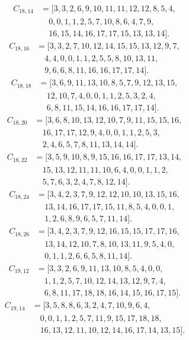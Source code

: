 \documentclass[11pt,a4paper]{article}
\theoremstyle{definition}\newtheorem{definition}[theorem]{Definition}
\theoremstyle{remark}\newtheorem{remark}[theorem]{Remark}
\begin{document}
\[\begin{aligned}
C_{18,14}&=[3,3,2,6,9,10,11,11,12,12,8,5,4,\\
&\quad 0,0,1,1,2,5,7,10,8,6,4,7,9,\\
&\quad 16,15,14,16,17,17,15,13,13,14].
\end{aligned}\]
\[\begin{aligned}
C_{18,16}&=[3,3,2,7,10,12,14,15,15,13,12,9,7,\\
&\quad 4,4,0,0,1,1,2,5,5,8,10,13,11,\\
&\quad 9,6,6,8,11,16,16,17,17,14].
\end{aligned}\]
\[\begin{aligned}
C_{18,18}&=[3,6,9,11,13,10,8,5,7,9,12,13,15,\\
&\quad 12,10,7,4,0,0,1,1,2,5,3,2,4,\\
&\quad 6,8,11,15,14,16,16,17,17,14].
\end{aligned}\]
\[\begin{aligned}
C_{18,20}&=[3,6,8,10,13,12,10,7,9,11,15,15,16,\\
&\quad 16,17,17,12,9,4,0,0,1,1,2,5,3,\\
&\quad 2,4,6,5,7,8,11,13,14,14].
\end{aligned}\]
\[\begin{aligned}
C_{18,22}&=[3,5,9,10,8,9,15,16,16,17,17,13,14,\\
&\quad 15,13,12,11,11,10,6,4,0,0,1,1,2,\\
&\quad 5,7,6,3,2,4,7,8,12,14].
\end{aligned}\]
\[\begin{aligned}
C_{18,24}&=[3,4,2,3,7,9,12,12,10,10,13,15,16,\\
&\quad 13,14,16,17,17,15,11,8,5,4,0,0,1,\\
&\quad 1,2,6,8,9,6,5,7,11,14].
\end{aligned}\]
\[\begin{aligned}
C_{18,26}&=[3,4,2,3,7,9,12,16,15,15,17,17,16,\\
&\quad 13,14,12,10,7,8,10,13,11,9,5,4,0,\\
&\quad 0,1,1,2,6,6,5,8,11,14].
\end{aligned}\]
\[\begin{aligned}
C_{19,12}&=[3,3,2,6,9,11,13,10,8,5,4,0,0,\\
&\quad 1,1,2,5,7,10,12,14,13,12,9,7,4,\\
&\quad 6,8,11,17,18,18,16,14,15,16,17,15].
\end{aligned}\]
\[\begin{aligned}
C_{19,14}&=[3,5,8,8,6,3,2,4,7,10,9,6,4,\\
&\quad 0,0,1,1,2,5,7,11,9,15,17,18,18,\\
&\quad 16,13,12,11,10,12,14,16,17,14,13,15].
\end{aligned}\]
\end{document}

